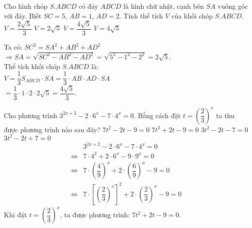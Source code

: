 \begin{ex}%
 Cho hình chóp $S.ABCD$ có đáy $ABCD$ là hình chữ nhật, cạnh bên $SA$ vuông góc với đáy. Biết $SC = 5$, $AB = 1$, $AD = 2$. Tính thể tích $V$ của khối chóp $S.ABCD$.
 \choice
  {$V = \dfrac{2\sqrt{5}}{3}$}
  {$V = 2\sqrt{5}$}
  {\True $V = \dfrac{4\sqrt{5}}{3}$}
  {$V = 4\sqrt{5}$}
 \loigiai
  {
  \immini
  {
  Ta có: $SC^2 = SA^2 + AB^2 + AD^2$\\
  $\Rightarrow SA = \sqrt{SC^2 - AB^2 - AD^2} = \sqrt{5^2 - 1^2 - 2^2} = 2\sqrt{5}$.\\
  Thể tích khối chóp $S.ABCD$ là:\\
  $V = \dfrac{1}{3}S_{ABCD} \cdot SA = \dfrac{1}{3} \cdot AB \cdot AD \cdot SA$\\
  \hspace*{0.5cm}$= \dfrac{1}{3} \cdot 1 \cdot2 \cdot 2\sqrt{5} = \dfrac{4\sqrt{5}}{3}$.}
{
  }
  }
\end{ex}


\begin{ex}%
 Cho phương trình $3^{2x+2} - 2 \cdot 6^x - 7 \cdot 4^x = 0$. Bằng cách đặt $t = \left(\dfrac{2}{3}\right)^x$ ta thu được phương trình nào sau đây?
 \choice
  {$7t^2 - 2t - 9 = 0$}
  {\True $7t^2 + 2t - 9 = 0$}
  {$3t^2 - 2t - 7 = 0$}
  {$3t^2 - 2t + 7 = 0$}
 \loigiai
  {
  \allowdisplaybreaks
  \begin{align*}
   				   & 3^{2x+2} - 2 \cdot 6^x - 7 \cdot 4^x = 0\\
   \Leftrightarrow & 7 \cdot 4^2 + 2 \cdot 6^x - 9 \cdot 9^x = 0\\
   \Leftrightarrow & 7 \cdot \left( \dfrac{4}{9} \right)^x + 2 \cdot \left( \dfrac{6}{9} \right)^x - 9 = 0\\
   \Leftrightarrow & 7 \cdot \left[ \left( \dfrac{2}{3} \right)^x \right]^2 + 2 \cdot \left( \dfrac{2}{3} \right)^x - 9 = 0
  \end{align*}
  Khi đặt $t = \left( \dfrac{2}{3} \right)^x$, ta được phương trình: $7t^2 + 2t - 9 = 0$.
  }
\end{ex}


